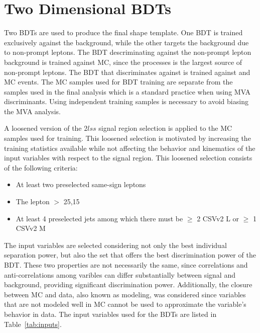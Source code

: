 \section{Two Dimensional BDTs}
\label{sec:2D_BDT}
Two BDTs are used to produce the final shape template. One BDT is trained exclusively against the \ttv background, while the other targets the background due to non-prompt
leptons. The BDT descriminating against the non-prompt lepton background is trained against \ttbar MC, since the \ttbar processes is the largest source of non-prompt leptons.
The BDT that discriminates against \ttv is trained against \ttw and \ttz MC events. The MC samples used for BDT training are separate from the samples used in the final
analysis which is a standard practice when using MVA discriminants. Using independent training samples is necessary to avoid biasing the MVA analysis. 

A loosened version of the $2lss$ signal region selection is applied to the MC samples used for training. This loosened selection is motivated by increasing the training statistics available
while not affecting the behavior and kinematics of the input variables with respect to the signal region. This loosened selection consists of the following criteria:
\begin{itemize}
\item At least two preselected same-sign leptons
\item The lepton \pt $>$ 25,15 
\item At least 4 preselected jets among which there must be $\geq$ 2 CSVv2 L or $\geq$ 1 CSVv2 M
\end{itemize}

The input variables are selected considering not only the best individual separation power, but also the set that offers the best discrimination power of the BDT. These two
properties are not necessarily the same, since correlations and anti-correlations among varibles can differ substantially between signal and background, providing significant
discrimination power. Additionally, the closure between MC and data, also known as modeling, was considered since variables that are not modeled well in MC cannot be used to
approximate the variable's behavior in data. The input variables used for the BDTs are listed in Table~\ref{tab:inputs}.


